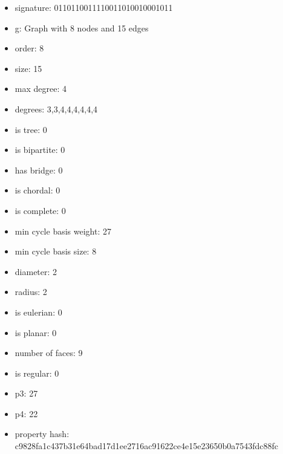 \begin{itemize}
\item signature: 0110110011110011010010001011
\item g: Graph with 8 nodes and 15 edges
\item order: 8
\item size: 15
\item max degree: 4
\item degrees: 3,3,4,4,4,4,4,4
\item is tree: 0
\item is bipartite: 0
\item has bridge: 0
\item is chordal: 0
\item is complete: 0
\item min cycle basis weight: 27
\item min cycle basis size: 8
\item diameter: 2
\item radius: 2
\item is eulerian: 0
\item is planar: 0
\item number of faces: 9
\item is regular: 0
\item p3: 27
\item p4: 22
\item property hash: c9828fa1c437b31e64bad17d1ee2716ac91622ce4e15e23650b0a7543fdc88fc
\end{itemize}
\newpage
\begin{figure}
\end{figure}
